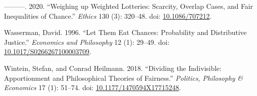 \documentclass[
  11pt,
  letterpaper,
  DIV=11,
  numbers=noendperiod,
  twoside]{scrartcl}
\newlength{\cslhangindent}
\newenvironment{CSLReferences}[2] %
 {\begin{list}{}{%
  \setlength{\itemindent}{0pt}
  \setlength{\leftmargin}{0pt}
  \setlength{\parsep}{0pt}
  \ifodd #1
   \setlength{\leftmargin}{\cslhangindent}
   \setlength{\itemindent}{-1\cslhangindent}
  \fi
  \setlength{\itemsep}{#2\baselineskip}}}
 {\end{list}}
\begin{document}
\begin{CSLReferences}{1}{0}
---------. 2020. {``Weighing up Weighted Lotteries: Scarcity, Overlap
Cases, and Fair Inequalities of Chance.''} \emph{Ethics} 130 (3):
320--48. doi: \href{https://doi.org/10.1086/707212}{10.1086/707212}.

Wasserman, David. 1996. {``Let Them Eat Chances: Probability and
Distributive Justice.''} \emph{Economics and Philosophy} 12 (1): 29--49.
doi:
\href{https://doi.org/10.1017/S0266267100003709}{10.1017/S0266267100003709}.

Wintein, Stefan, and Conrad Heilmann. 2018. {``Dividing the Indivisible:
Apportionment and Philosophical Theories of Fairness.''} \emph{Politics,
Philosophy \& Economics} 17 (1): 51--74. doi:
\href{https://doi.org/10.1177/1470594X17715248}{10.1177/1470594X17715248}.

\end{CSLReferences}
\end{document}
